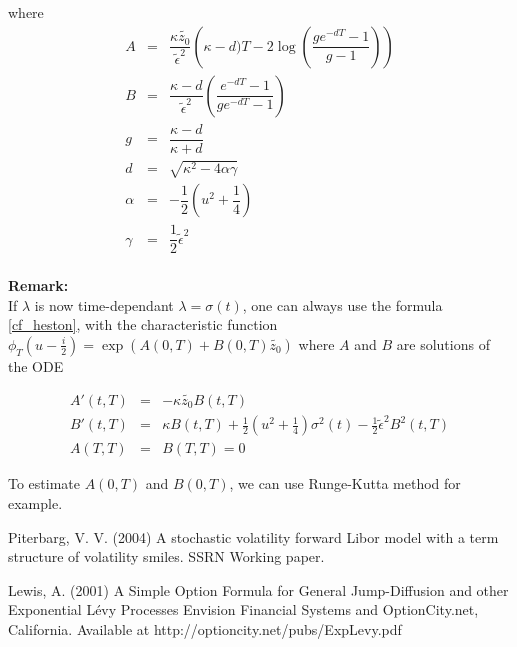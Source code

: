\documentclass[12pt,a4paper]{article}
\begin{document}
where 
\begin{eqnarray*}
A &=& \dfrac{\kappa \tilde{z_0}}{\tilde{\epsilon}^2} \left( \kappa-d)T-2\log(\dfrac{ge^{-dT}-1}{g-1})\right) \\ 
B &=& \dfrac{\kappa-d}{\tilde{\epsilon}^2} \left( \dfrac{e^{-dT}-1}{ge^{-dT}-1} \right) \\
g &=& \dfrac{\kappa-d}{\kappa+d} \\
d &=& \sqrt{\kappa^2-4\alpha \gamma}\\
\alpha &=&  -\dfrac{1}{2} (u^2 + \dfrac{1}{4})\\
\gamma &=& \dfrac{1}{2} \tilde{\epsilon}^2
\end{eqnarray*}\\

\textbf{Remark:}\\

 If $\lambda$ is now time-dependant $\lambda=\sigma(t)$, one can always use the formula \ref{cf_heston}, with the characteristic function $\phi_T(u-\frac{i}{2}) = \exp(A(0,T) + B(0,T) \tilde{z_0})$ where $A$ and $B$ are solutions of the ODE
 
\begin{eqnarray*}
A'(t,T) &=& -\kappa \tilde{z_0} B(t,T)\\ 
B'(t,T) &=& \kappa B(t,T) + \frac{1}{2}(u^2+\frac{1}{4})\sigma^2(t) - \frac{1}{2} \tilde{\epsilon}^2 B^2(t,T)\\
A(T,T) &=& B(T,T) = 0
\end{eqnarray*}

To estimate $A(0,T)$ and $B(0,T)$, we can use Runge-Kutta method for example.

\newpage
\begin{thebibliography}{1}

   

Piterbarg, V. V. (2004)
\newblock A stochastic volatility forward Libor model with a term structure of volatility smiles.
\newblock SSRN Working paper.


Lewis, A. (2001)
\newblock A Simple Option Formula for General Jump-Diffusion and other Exponential Lévy Processes
\newblock Envision Financial Systems and OptionCity.net, California. Available at http://optioncity.net/pubs/ExpLevy.pdf



\end{thebibliography}


\end{document}
